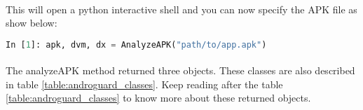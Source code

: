 \documentclass[../main.tex]{subfile}
\begin{document}
			\paragraph{} This will open a python interactive shell and you can now specify the APK file as show below:
				\begin{lstlisting}[language=python, numbers=none]
					In [1]: apk, dvm, dx = AnalyzeAPK("path/to/app.apk")
				\end{lstlisting}
			\paragraph{} The analyzeAPK method returned three objects. These classes are also described in table \ref{table:androguard_classes}. Keep reading after the table \ref{table:androguard_classes} to know more about these returned objects.
			
\end{document}
